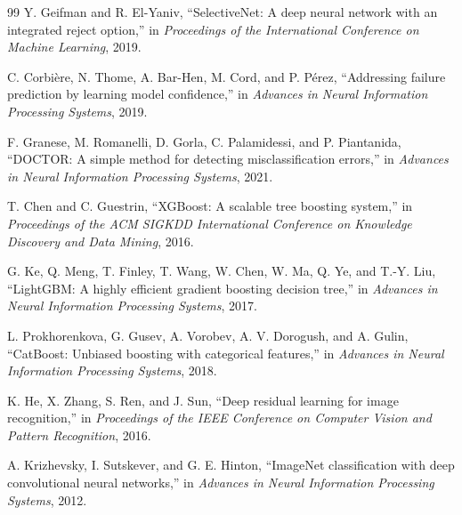 \documentclass[10pt,conference]{IEEEtran}
\begin{document}
\begin{thebibliography}{99}
Y. Geifman and R. El-Yaniv, ``SelectiveNet: A deep neural network with an
integrated reject option,'' in \emph{Proceedings of the International
Conference on Machine Learning}, 2019.

C. Corbi\`ere, N. Thome, A. Bar-Hen, M. Cord, and P. P\'erez, ``Addressing
failure prediction by learning model confidence,'' in \emph{Advances in
Neural Information Processing Systems}, 2019.

F. Granese, M. Romanelli, D. Gorla, C. Palamidessi, and P. Piantanida,
``DOCTOR: A simple method for detecting misclassification errors,'' in
\emph{Advances in Neural Information Processing Systems}, 2021.

T. Chen and C. Guestrin, ``XGBoost: A scalable tree boosting system,'' in
\emph{Proceedings of the ACM SIGKDD International Conference on
Knowledge Discovery and Data Mining}, 2016.

G. Ke, Q. Meng, T. Finley, T. Wang, W. Chen, W. Ma, Q. Ye, and T.-Y. Liu,
``LightGBM: A highly efficient gradient boosting decision tree,'' in
\emph{Advances in Neural Information Processing Systems}, 2017.

L. Prokhorenkova, G. Gusev, A. Vorobev, A. V. Dorogush, and A. Gulin,
``CatBoost: Unbiased boosting with categorical features,'' in
\emph{Advances in Neural Information Processing Systems}, 2018.

K. He, X. Zhang, S. Ren, and J. Sun, ``Deep residual learning for image
recognition,'' in \emph{Proceedings of the IEEE Conference on Computer
Vision and Pattern Recognition}, 2016.

A. Krizhevsky, I. Sutskever, and G. E. Hinton, ``ImageNet classification
with deep convolutional neural networks,'' in \emph{Advances in Neural
Information Processing Systems}, 2012.


\end{thebibliography}
\end{document}
